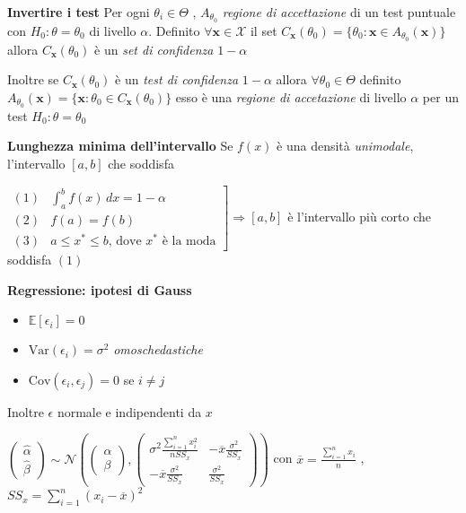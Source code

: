 \documentclass[openany]{book} %
\begin{document}
\textbf{Invertire i test} Per ogni $\theta_i\in\Theta$ , $A_{\theta_0}$ \textit{regione di accettazione} di un test puntuale con $H_0:\theta=\theta_0$ di livello $\alpha$. Definito $\forall \boldsymbol{x}\in \mathcal{X}$ il set $C_{\boldsymbol{x}}(\theta_0)=\{\theta_0:\boldsymbol{x}\in A_{\theta_0}(\boldsymbol{x})\}$ allora $C_{\boldsymbol{x}}(\theta_0)$ è un \textit{set di confidenza} $1-\alpha$

Inoltre se $C_{\boldsymbol{x}}(\theta_0)$ è un \textit{test di confidenza} $1-\alpha$ allora $\forall\theta_0\in\Theta$ definito $A_{\theta_0}(\boldsymbol{x})=\{\boldsymbol{x}:\theta_0\in C_{\boldsymbol{x}}(\theta_0)\}$ esso è una \textit{regione di accetazione} di livello $\alpha$ per un test $H_0:\theta=\theta_0$

\textbf{Lunghezza minima dell'intervallo} Se $f(x)$ è una densità \textit{unimodale}, l'intervallo $[a,b]$ che soddisfa 

$\left. \begin{array}{ll} 
(1) & \int_a^bf(x)\,dx=1-\alpha\\
(2) & f(a)=f(b)\\
(3) & a\leq x^*\leq b \text{, dove }x^* \text{ è la moda}	
\end{array}\right]
\Rightarrow [a,b]$ è l'intervallo più corto che soddisfa $(1)$

\textbf{Regressione: ipotesi di Gauss} 

\begin{itemize}

\item $\mathbb{E}[\epsilon_i]=0$

\item $\text{Var}(\epsilon_i)=\sigma^2$ \textit{omoschedastiche}

\item $\text{Cov}(\epsilon_i,\epsilon_j)=0$ se $i\neq j$

\end{itemize}

Inoltre $\epsilon$ normale e indipendenti da $x$

$\left(\begin{array}{c}\hat\alpha \\ \hat\beta\end{array}\right)\sim \mathcal{N}\left(\left(\begin{array}{c} \alpha \\ \beta \end{array}\right),\left(\begin{array}{cc} \sigma^2 \frac{\sum_{i=1}^nx_i^2}{nSS_x} & -\overline x \frac{\sigma^2}{SS_x} \\ -\overline x \frac{\sigma^2}{SS_x} & \frac{\sigma^2}{SS_x} \end{array}\right)\right)$ con $\overline x = \frac{\sum_{i=1}^nx_i}{n}$ , $SS_x = \sum_{i=1}^n(x_i-\overline x)^2 $
\end{document}
